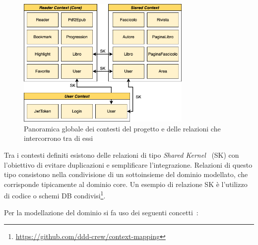 \begin{figure}[H]
    \centering
    \includegraphics[width=0.75\textwidth]{img/ddd-context-map.png}
    \caption{Panoramica globale dei contesti del progetto e delle relazioni che intercorrono tra di essi}
    \label{context-map-png}
\end{figure}

Tra i contesti definiti esistono delle relazioni di tipo \textit{Shared Kernel}~\cite{evans_domain-driven_2004} (SK) con l'obiettivo di evitare duplicazioni e semplificare l'integrazione.
Relazioni di questo tipo consistono nella condivisione di un sottoinsieme del dominio modellato, 
che corrisponde tipicamente al dominio core. 
Un esempio di relazione SK è l'utilizzo di codice o schemi DB condivisi\footnote{\href{https://github.com/ddd-crew/context-mapping}{https://github.com/ddd-crew/context-mapping}}. 

Per la modellazione del dominio si fa uso dei seguenti concetti~\cite{evans_domain-driven_2004}:

